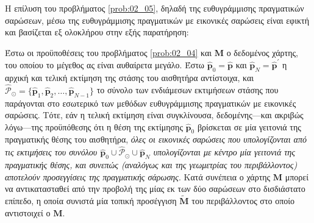 Η επίλυση του προβλήματος \ref{prob:02_05}, δηλαδή της ευθυγράμμισης
πραγματικών σαρώσεων, μέσω της ευθυγράμμισης πραγματικών με εικονικές σαρώσεις
είναι εφικτή και βασίζεται εξ ολοκλήρου στην εξής παρατήρηση:

Έστω οι προϋποθέσεις του προβλήματος \ref{prob:02_04} και $\bm{M}$ ο δεδομένος
χάρτης, του οποίου το μέγεθος ας είναι αυθαίρετα μεγάλο. Έστω $\hat{\bm{p}}_0 =
\hat{\bm{p}}$ και $\hat{\bm{p}}_N = \hat{\bm{p}}^\prime$ η αρχική και τελική
εκτίμηση της στάσης του αισθητήρα αντίστοιχα, και $\hat{\mathcal{P}}_\odot =
\{\hat{\bm{p}}_1, \hat{\bm{p}}_2,\dots, \hat{\bm{p}}_{N-1}\}$ το σύνολο των
ενδιάμεσων εκτιμήσεων στάσης που παράγονται στο εσωτερικό των μεθόδων
ευθυγράμμισης πραγματικών με εικονικές σαρώσεις. Τότε, εάν η τελική εκτίμηση
είναι συγκλίνουσα, δεδομένης---και ακριβώς λόγω---της προϋπόθεσης ότι η θέση
της εκτίμησης $\hat{\bm{p}}_0$ βρίσκεται σε μία γειτονιά της πραγματικής θέσης
του αισθητήρα, \textit{όλες οι εικονικές σαρώσεις που υπολογίζονται από τις
εκτιμήσεις του συνόλου $\hat{\bm{p}}_0 \cup \hat{\mathcal{P}}_\odot \cup
\hat{\bm{p}}_N$ υπολογίζονται με κέντρο μία γειτονιά της πραγματικής θέσης, και
συνεπώς (αναλόγως και της γεωμετρίας του περιβάλλοντος) αποτελούν προσεγγίσεις
της πραγματικής σάρωσης}. Κατά συνέπεια ο χάρτης $\bm{M}$ μπορεί να
αντικατασταθεί από την προβολή της μίας εκ των δύο σαρώσεων στο δισδιάστατο
επίπεδο, η οποία συνιστά μία τοπική προσέγγιση $\widetilde{\bm{M}}$ του
περιβάλλοντος στο οποίο αντιστοιχεί ο $\bm{M}$.

